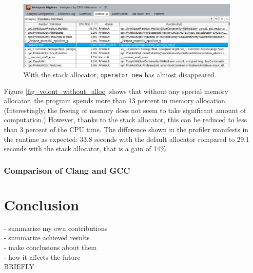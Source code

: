 \documentclass[12pt]{article}
\newcommand{\code}[1]{\texttt{#1}}
\begin{document}
\begin{figure}[H]
	\begin{center}
		\includegraphics[width=\textwidth]{velout_with_alloc}
	\end{center}
	\caption{With the stack allocator, \code{operator new} has almost disappeared.}
	\label{fig_velout_with_alloc}
\end{figure}

Figure \ref{fig_velout_without_alloc} shows that without any special memory allocator, the program spends more than 13 percent in memory allocation. (Interestingly, the freeing of memory does not seem to take significant amount of computation.) However, thanks to the stack allocator, this can be reduced to less than 3 percent of the CPU time. The difference shown in the profiler manifests in the runtime as expected: 33.8 seconds with the default allocator compared to 29.1 seconds with the stack allocator, that is a gain of 14\%.


\subsubsection{Comparison of Clang and GCC}


\newpage
\section{Conclusion}

\color{red}
- summarize my own contributions \\
- summarize achieved results \\
- make conclusions about them \\
- how it affects the future \\
BRIEFLY
\color{black}


\newpage
\end{document}
